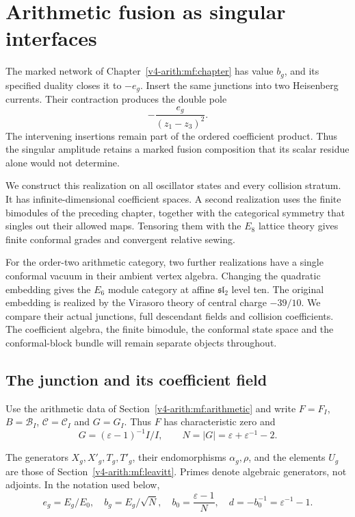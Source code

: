 \chapter{Arithmetic fusion as singular interfaces}
\label{v4-arith:asi:chapter}

The marked network of Chapter~\ref{v4-arith:mf:chapter} has value
\(b_g\), and its specified duality closes it to \(-e_g\).
Insert the same junctions into two Heisenberg currents. Their
contraction produces the double pole
\[
 -\frac{e_g}{(z_1-z_3)^2}.
\]
The intervening insertions remain part of the ordered coefficient
product. Thus the singular amplitude retains a marked fusion
composition that its scalar residue alone would not determine.

We construct this realization on all oscillator states and every
collision stratum. It has infinite-dimensional coefficient spaces.
A second realization uses the finite bimodules of the preceding
chapter, together with the categorical symmetry that singles out
their allowed maps. Tensoring them with the \(E_8\) lattice theory
gives finite conformal grades and convergent relative sewing.

For the order-two arithmetic category, two further realizations have
a single conformal vacuum in their ambient vertex algebra.
Changing the quadratic embedding gives the \(E_6\) module category
at affine \(\mathfrak{sl}_2\) level ten. The original embedding is
realized by the Virasoro theory of central charge \(-39/10\).
We compare their actual junctions, full descendant fields and
collision coefficients. The coefficient algebra, the finite
bimodule, the conformal state space and the conformal-block bundle
will remain separate objects throughout.

\section{The junction and its coefficient field}

Use the arithmetic data of Section~\ref{v4-arith:mf:arithmetic} and write
\(F=F_I\), \(B=\mathcal B_I\), \(\mathcal C=\mathcal C_I\) and
\(G=G_I\). Thus \(F\) has characteristic zero and
\[
 G=(\varepsilon-1)^{-1}I/I,\qquad
 N=|G|=\varepsilon+\varepsilon^{-1}-2.
\]

The generators \(X_g,X'_g,T_g,T'_g\), their endomorphisms
\(\alpha_g,\rho\), and the elements \(U_g\) are those of
Section~\ref{v4-arith:mf:leavitt}. Primes denote algebraic generators,
not adjoints. In the notation used below,
\begin{equation}\label{v4-arith:asi:normalizations}
 e_g=E_g/E_0,\quad b_g=E_g/\sqrt N,\quad
 b_0=\frac{\varepsilon-1}{N},\quad
 d=-b_0^{-1}=\varepsilon^{-1}-1.
\end{equation}

